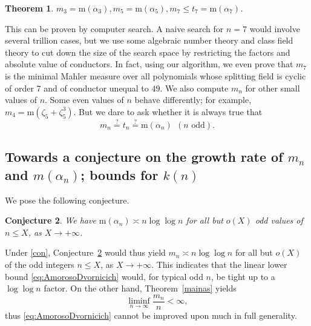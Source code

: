 \documentclass[12pt,reqno]{amsart}
\newtheorem{introtheorem}{Theorem}
\newtheorem{introconjecture}[introtheorem]{Conjecture}
\theoremstyle{definition}
\theoremstyle{plain}
\theoremstyle{definition}
\newcommand\m{\mathrm{m}}
\renewcommand{\leq}{\leqslant}
\begin{document}
\begin{introtheorem} \label{mainMM} 
$m_3 = \m(\alpha_3), m_5 = \m(\alpha_5), m_7 \leq t_7 = \m(\alpha_7)$. 
\end{introtheorem}

This can be proven by computer search. A naive search for $n=7$ would involve several trillion cases, but we use some algebraic number theory and class field theory to cut down the size of the search space by restricting the factors and absolute value of conductors. 
In fact, using our algorithm, we even prove that $m_7$ is the minimal Mahler measure over all polynomials whose splitting field is cyclic of order $7$ and of conductor unequal to $49$. 
We also compute $m_n$ for other small values of $n$. Some even values of $n$ behave differently; for example, $m_4 = \m(\zeta_5 + \zeta_5^3)$.  But we dare to ask whether it is always true that 
\begin{equation} 
\label{con} 
m_n \stackrel{?}{=} t_n \stackrel{?}{=}\m(\alpha_n) \ \ (n \mbox{ odd}).
\end{equation} 

\subsection*{Towards a conjecture on the growth rate of $m_n$ and $m(\alpha_n)$; bounds for $k(n)$} 
We pose the following conjecture.
\begin{introconjecture} 
\label{mainconj} 
We have $\m(\alpha_n) \asymp n \log{\log{n}}$ for all but $o(X)$ odd values of $n \leq X$, as $X \rightarrow + \infty$.
\end{introconjecture} 
Under \eqref{con}, Conjecture~\ref{mainconj} would thus yield $m_n \asymp n \log{\log{n}}$ for all but $o(X)$ of the odd integers $n \leq X$, as $X \to +\infty$. This indicates that the linear lower bound \eqref{eq:AmorosoDvornicich} would, for typical odd $n$, be tight up to a $\log{\log{n}}$ factor. On the other hand, Theorem~\ref{mainas} yields
\begin{equation*}
\liminf_{n \to \infty} \frac{m_n}{n} < \infty,
\end{equation*}
thus \eqref{eq:AmorosoDvornicich} cannot be improved upon much in full generality.
\end{document}
